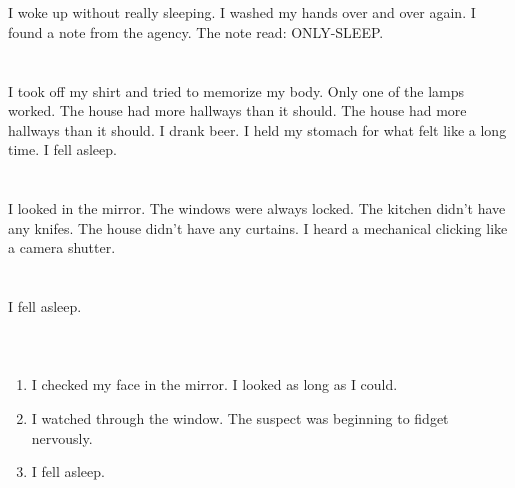 \documentclass{article}
\begin{document}
    \section{}
    I woke up without really sleeping. I washed my hands over and over again. I found a note from the agency. The note read: ONLY-SLEEP.  
    \newpage
    
    \section{}
    I took off my shirt and tried to memorize my body. Only one of the lamps worked. The house had more hallways than it should. The house had more hallways than it should. I drank beer. I held my stomach for what felt like a long time. I fell asleep.  
    \newpage
    
    \section{}
    I looked in the mirror. The windows were always locked. The kitchen didn't have any knifes. The house didn't have any curtains. I heard a mechanical clicking like a camera shutter.  
    \newpage
    
    \section{}
    I fell asleep.\\\\ 
    \newpage
    
    \section{}
    
    \begin{enumerate}
    
    \item I checked my face in the mirror. I looked as long as I could.\\
    
    \item I watched through the window. The suspect was beginning to fidget nervously.\\
    
    \item I fell asleep.\\
    
    \end{enumerate}
     
\end{document}
